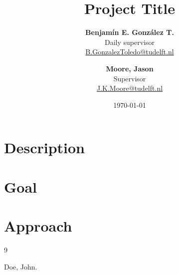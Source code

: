 \documentclass{article}
\title{Project Title}
\author{
  \textbf{Benjamín E. González T.}\\
  Daily supervisor \\
  \small{\href{mailto: b.gonzaleztoledo@tudelft.nl}{B.GonzalezToledo@tudelft.nl}}
  \and
  \textbf{Moore, Jason}\\
  Supervisor\\
  \small{\href{mailto: j.k.moore@tudelft.nl}{J.K.Moore@tudelft.nl}}
}
\date{\today}
\begin{document}
\maketitle

\section{Description}

\section{Goal}

\section{Approach}




\begin{thebibliography}{9}

 Doe, John.

\end{thebibliography}
\end{document}

